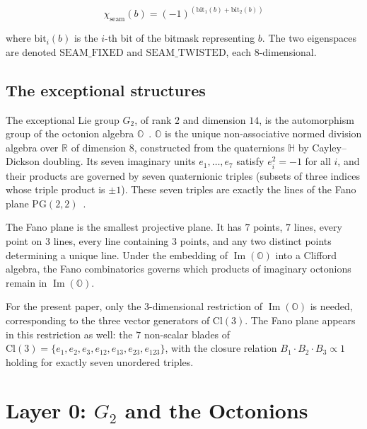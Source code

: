 \documentclass[11pt,a4paper]{article}
\theoremstyle{plain}
\theoremstyle{definition}
\theoremstyle{remark}
\numberwithin{equation}{section}
\providecommand{\Cl}{\mathrm{Cl}}
\providecommand{\HH}{\mathbb{H}}
\providecommand{\OO}{\mathbb{O}}
\providecommand{\RR}{\mathbb{R}}
\providecommand{\PG}{\mathrm{PG}}
\DeclareMathOperator{\Img}{Im}
\begin{document}
\begin{equation}\label{eq:seam}
  \chi_{\mathrm{seam}}(b) = (-1)^{(\mathrm{bit}_1(b) +
                                    \mathrm{bit}_2(b))}
\end{equation}

where $\mathrm{bit}_i(b)$ is the $i$-th bit of the bitmask
representing $b$.  The two eigenspaces are denoted
$\mathrm{SEAM\_FIXED}$ and $\mathrm{SEAM\_TWISTED}$, each
$8$-dimensional.


\subsection{The exceptional structures}\label{sec:bg-exceptional}

The exceptional Lie group $G_2$, of rank $2$ and dimension $14$, is
the automorphism group of the octonion algebra
$\OO$~\cite{baez2002}.  $\OO$ is the unique non-associative normed
division algebra over $\RR$ of dimension $8$, constructed from the
quaternions $\HH$ by Cayley--Dickson doubling.  Its seven imaginary
units $e_1, \ldots, e_7$ satisfy $e_i^2 = -1$ for all $i$, and
their products are governed by seven quaternionic triples (subsets
of three indices whose triple product is $\pm 1$).  These seven
triples are exactly the lines of the Fano plane
$\PG(2,2)$~\cite{baez2002}.

The Fano plane is the smallest projective plane.  It has $7$
points, $7$ lines, every point on $3$ lines, every line containing
$3$ points, and any two distinct points determining a unique line.
Under the embedding of $\Img(\OO)$ into a Clifford algebra, the
Fano combinatorics governs which products of imaginary octonions
remain in $\Img(\OO)$.

For the present paper, only the $3$-dimensional restriction of
$\Img(\OO)$ is needed, corresponding to the three vector generators
of $\Cl(3)$.  The Fano plane appears in this restriction as well:
the $7$ non-scalar blades of $\Cl(3) = \{e_1, e_2, e_3, e_{12},
e_{13}, e_{23}, e_{123}\}$, with the closure relation
$B_1 \cdot B_2 \cdot B_3 \propto 1$ holding for exactly seven
unordered triples.


\section{Layer 0: $G_2$ and the Octonions}\label{sec:layer0}
\end{document}
